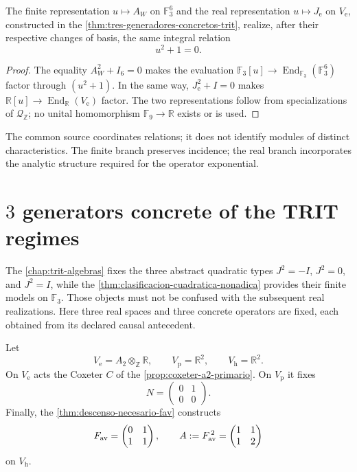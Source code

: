 \begin{theorem}
\label{thm:dos-realizaciones-fuente-cuadratica-rev3}
The finite representation \(u\mapsto A_W\) on
\(\mathbb F_3^6\) and the real representation \(u\mapsto J_{\mathrm e}\) on
\(V_{\mathrm e}\), constructed in the
\cref{thm:tres-generadores-concretos-trit}, realize, after their
respective changes of basis, the same integral relation
\[
 u^2+1=0.
\]
\end{theorem}

\begin{proof}
The equality \(A_W^2+I_6=0\) makes the evaluation
\(\mathbb F_3[u]\to\operatorname{End}_{\mathbb F_3}(\mathbb F_3^6)\) factor through
\((u^2+1)\). In the same way, \(J_{\mathrm e}^2+I=0\) makes
\(\mathbb R[u]\to\operatorname{End}_{\mathbb R}(V_{\mathrm e})\) factor. The two
representations follow from specializations of
\(\mathcal Q_{\mathbb Z}\); no unital homomorphism
\(\mathbb F_9\to\mathbb R\) exists or is used.
\end{proof}

The common source coordinates relations; it does not identify modules of
distinct characteristics. The finite branch preserves incidence; the real branch
incorporates the analytic structure required for the operator exponential.

\section{\(3\) generators concrete of the TRIT regimes}
\label{sec:tres-generadores-concretos-trit}

The \cref{chap:trit-algebras} fixes the three abstract quadratic types
\(J^2=-I\), \(J^2=0\), and \(J^2=I\), while the
\cref{thm:clasificacion-cuadratica-nonadica} provides their finite models
on \(\mathbb F_3\). Those objects must not be confused with the
subsequent real realizations. Here three real spaces and three concrete
operators are fixed, each obtained from its declared causal antecedent.

Let
\[
V_{\mathrm e}=A_2\otimes_{\mathbb Z}\mathbb R,
\qquad
V_{\mathrm p}=\mathbb R^2,
\qquad
V_{\mathrm h}=\mathbb R^2.
\]
On \(V_{\mathrm e}\) acts the Coxeter \(C\) of the
\cref{prop:coxeter-a2-primario}. On \(V_{\mathrm p}\) it fixes
\[
N=
\begin{pmatrix}
0&1\\
0&0
\end{pmatrix}.
\]
Finally, the \cref{thm:descenso-necesario-fav} constructs
\[
F_{\rm av}=
\begin{pmatrix}
0&1\\
1&1
\end{pmatrix},
\qquad
A:=F_{\rm av}^{\,2}=
\begin{pmatrix}
1&1\\
1&2
\end{pmatrix}
\]
on \(V_{\mathrm h}\).

